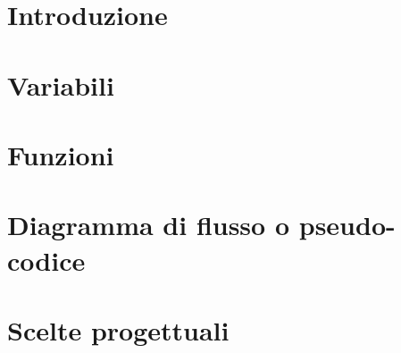 \documentclass[a4paper,11pt]{article}
\title{
	\textbf{
		Elaborato Assembly \\
		\noindent\rule{6cm}{0.4pt} \\  %
		Architettura degli Elaboratori
	}
}
\author{
	\getenv{asm_rel_author1} \\
	\getenv{asm_rel_author2} \\
	\getenv{asm_rel_author3}
}
\date{Anno 2020/2021}
\begin{document}


\null  %
\nointerlineskip  %
\vfill
\let\snewpage \newpage
\let\newpage \relax
\maketitle
\let \newpage \snewpage
\vfill
\break %

\newpage


\tableofcontents
\newpage


\section{Introduzione}

\newpage


\section{Variabili}

\newpage


\section{Funzioni}

\newpage


\section{Diagramma di flusso o pseudo-codice}

\newpage


\section{Scelte progettuali}

\newpage
\end{document}
